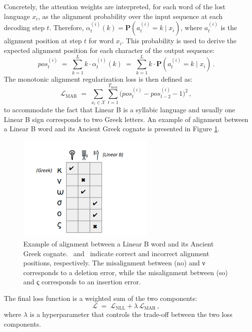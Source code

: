 Concretely, the attention weights are interpreted, for each word of the lost language $x_i$, as the alignment probability over the input sequence at each decoding step $t$.
Therefore, $\alpha_t^{(i)}(k) = \mathbf{P}(a_t^{(i)}=k \mid x_i)$, where $a_t^{(i)}$ is the alignment position at step $t$ for word $x_i$.
This probability is used to derive the expected alignment position for each character of the output sequence:
\[
pos_t^{(i)} \;=\; \sum_{k=1}^{L} k \cdot \alpha_t^{(i)}(k)
\;=\; \sum_{k=1}^{L} k \cdot \mathbf{P}(a_t^{(i)}=k \mid x_i) \, .
\]
The monotonic alignment regularization loss is then defined as:
\[
\mathcal{L}_{\mathrm{MAR}} \;=\; \sum_{x_i \in \mathcal{X}} \sum_{t=1}^{T_{\max}} \bigl(pos_t^{(i)} - pos_{t-2}^{(i)} - 1\bigr)^2 \, ,
\]
to accommodate the fact that Linear B is a syllabic language and usually one Linear B sign corresponds to two Greek letters.
An example of alignment between a Linear B word and its Ancient Greek cognate is presented in Figure \ref{fig:alignment_example}.
\begin{figure}[H]
    \centering
    \includegraphics[width=0.6\textwidth]{Images/alignment.png} %
    \caption{Example of alignment between a Linear B word and its Ancient Greek cognate. \cmark\ and \xxmark\ indicate correct and incorrect alignment positions, respectively. The misalignment between \textlinb{\Bno} (no) and \textgreek{ν} corresponds to a deletion error, while the misalignment between \textlinb{\Bso} (so) and \textgreek{ς} corresponds to an insertion error.\protect\footnotemark}
    \label{fig:alignment_example}
\end{figure}

The final loss function is a weighted sum of the two components:
\[
\mathcal{L} \;=\; \mathcal{L}_{\mathrm{NLL}} + \lambda\,\mathcal{L}_{\mathrm{MAR}} \, ,
\]
where $\lambda$ is a hyperparameter that controls the trade-off between the two loss components.

